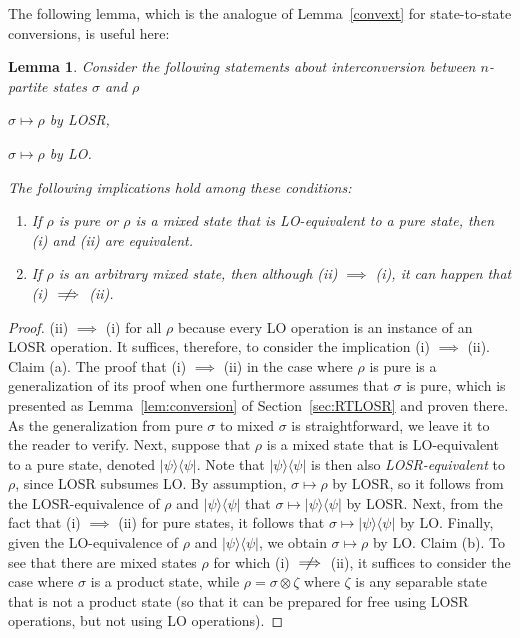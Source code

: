 \documentclass[12pt]{article}
\theoremstyle{plain}
\newtheorem{lem}[theo]{Lemma}
\theoremstyle{definition}
\newcommand{\nimplies}{\centernot{\implies}}
\begin{document}
The following lemma, which is the analogue of Lemma~\ref{convext} for state-to-state conversions, is useful here:
 \begin{samepage}
\begin{lem}
    \label{lem:conversion3}
    Consider the following statements about interconversion between $n$-partite states $\sigma$ and $\rho$
    \begin{compactenum}[(i)]
        \item  $\sigma \mapsto \rho $ by LOSR,
        \item  $\sigma \mapsto \rho $ by LO.
    \end{compactenum}
The following implications hold among these conditions:
 \begin{enumerate}
 \item[(a)] If $\rho$ is pure or $\rho$ is a mixed state that is LO-equivalent to a pure state, then  (i) and (ii) are equivalent.
\item[(b)] If $\rho$ is an arbitrary mixed state, then although (ii) $\implies$ (i), it can happen that (i) $\nimplies$ (ii).
 \end{enumerate} 
\end{lem}
\end{samepage}

\begin{proof}  (ii) $\implies$ (i) for all $\rho$ because every LO operation is an instance of an LOSR operation. It suffices, therefore, to consider the implication (i) $\implies$ (ii).  Claim (a).  The proof that (i) $\implies$ (ii) in the case where $\rho$ is pure is a generalization of its proof when one furthermore assumes that $\sigma$ is pure, which is  presented as Lemma~\ref{lem:conversion} of Section~\ref{sec:RTLOSR} and proven there.  As the generalization from pure $\sigma$ to mixed $\sigma$ is straightforward, we leave it to the reader to verify.  Next, suppose that $\rho$ is a mixed state that is LO-equivalent to a pure state, denoted $|\psi\rangle\langle \psi|$.  Note that $|\psi\rangle\langle \psi|$ is then also {\em LOSR-equivalent} to $\rho$, since LOSR subsumes LO.  By assumption, $\sigma \mapsto \rho$ by LOSR, so it follows from the LOSR-equivalence of $\rho$ and $|\psi\rangle\langle \psi|$  that $\sigma \mapsto |\psi\rangle\langle \psi|$ by LOSR.  Next, from the fact that  (i) $\implies$ (ii) for pure states, it follows that $\sigma \mapsto |\psi\rangle\langle \psi|$ by LO.  Finally, given the LO-equivalence of $\rho$ and $|\psi\rangle\langle \psi|$, we obtain $\sigma \mapsto \rho$ by LO. Claim (b). To see that there are mixed states $\rho$ for which (i) $\nimplies$ (ii), it suffices to consider the case where $\sigma$ is a product state, while $\rho=\sigma \otimes \zeta$ where $\zeta$ is any separable state that is not a product state (so that it can be prepared for free using LOSR operations, but not using LO operations). 
\end{proof}
\end{document}
